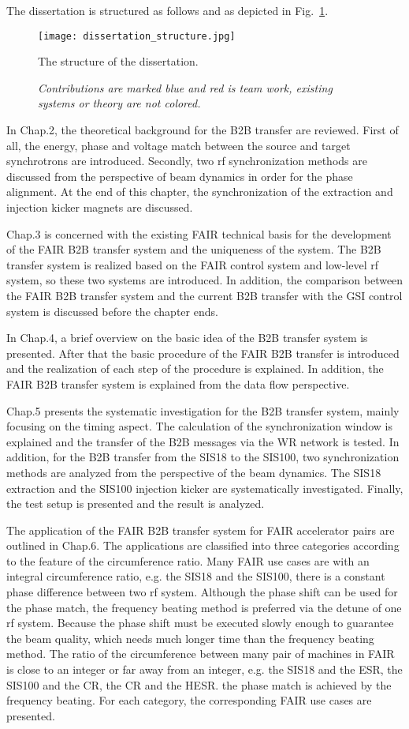 The dissertation is structured as follows and as depicted in Fig.~\ref{dissertation_structure}.
\begin{figure}[!htb]
   \centering   
   \texttt{[image: dissertation\_structure.jpg]}
   \caption{The structure of the dissertation.}
	\caption*{\textsl{\small{Contributions are marked blue and red is team work, existing systems or theory are not colored.}}}
   \label{dissertation_structure}
\end{figure}

In Chap.2, the theoretical background for the B2B transfer are reviewed. First of all, the energy, phase and voltage match between the source and target synchrotrons are introduced. Secondly, two rf synchronization methods are discussed from the perspective of beam dynamics in order for the phase alignment. At the end of this chapter, the synchronization of the extraction and injection kicker magnets are discussed.

Chap.3 is concerned with the existing FAIR technical basis for the development of the FAIR B2B transfer system and the uniqueness of the system. The B2B transfer system is realized based on the FAIR control system and low-level rf system, so these two systems are introduced. In addition, the comparison between the FAIR B2B transfer system and the current B2B transfer with the GSI control system is discussed before the chapter ends. 

In Chap.4, a brief overview on the basic idea of the B2B transfer system is presented. After that the basic procedure of the FAIR B2B transfer is introduced and the realization of each step of the procedure is explained. In addition, the FAIR B2B transfer system is explained from the data flow perspective.

Chap.5 presents the systematic investigation for the B2B transfer system, mainly focusing on the timing aspect. The calculation of the synchronization window is explained and the transfer of the B2B messages via the WR network is tested. In addition, for the B2B transfer from the SIS18 to the SIS100, two synchronization methods are analyzed from the perspective of the beam dynamics. The SIS18 extraction and the SIS100 injection kicker are systematically investigated. Finally, the test setup is presented and the result is analyzed.

The application of the FAIR B2B transfer system for FAIR accelerator pairs are outlined in Chap.6. The applications are classified into three categories according to the feature of the circumference ratio. Many FAIR use cases are with an integral circumference ratio, e.g. the SIS18 and the SIS100, there is a constant phase difference between two rf system. Although the phase shift can be used for the phase match, the frequency beating method is preferred via the detune of one rf system. Because the phase shift must be executed slowly enough to guarantee the beam quality, which needs much longer time than the frequency beating method. The ratio of the circumference between many pair of machines in FAIR is close to an integer or far away from an integer, e.g. the SIS18 and the ESR, the SIS100 and the CR, the CR and the HESR. the phase match is achieved by the frequency beating. For each category, the corresponding FAIR use cases are presented. 

%
%

